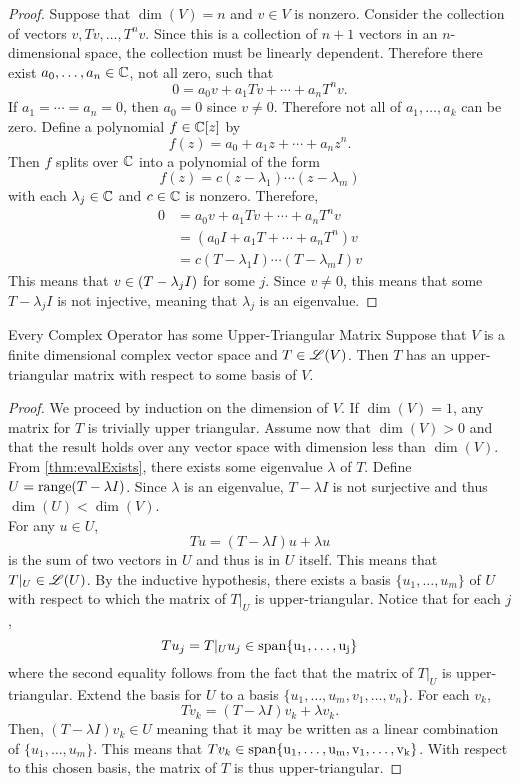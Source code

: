 \documentclass[../AlgebraQualSolutions.tex]{subfiles}
\begin{document}
\begin{proof}
    Suppose that $\dim(V) = n$ and $v \in V$ is nonzero. Consider the collection of vectors $v, Tv, \ldots, T^nv$. Since this is a collection of $n + 1$ vectors in an $n$-dimensional space, the collection must be linearly dependent. Therefore there exist $a_0,\ldots, a_n \in \mathbb{C}$, not all zero, such that
        \[0 = a_0 v + a_1Tv + \cdots + a_n T^n v.\]
    If $a_1 = \cdots = a_n = 0$, then $a_0 = 0$ since $v \neq 0$. Therefore not all of $a_1,\ldots, a_k$ can be zero. Define a polynomial $f \in \mathbb{C}[z]$ by
        \[f(z) = a_0 + a_1z + \cdots + a_nz^n. \]
    Then $f$ splits over $\mathbb{C}$ into a polynomial of the form
        \[f(z) = c(z- \lambda_1)\cdots (z - \lambda_m) \]
    with each $\lambda_j \in \mathbb{C}$ and $c \in \mathbb{C}$ is nonzero. Therefore,
        \begin{align*}
            0 &= a_0 v + a_1Tv + \cdots + a_n T^n v\\
            &= (a_0I + a_1T + \cdots + a_nT^n)v\\
            &= c(T- \lambda_1I)\cdots (T - \lambda_mI)v
        \end{align*}
    This means that $v \in \null(T - \lambda_j I)$ for some $j$. Since $v \neq 0$, this means that some $T - \lambda_j I$ is not injective, meaning that $\lambda_j$ is an eigenvalue.
\end{proof}

\gap

\begin{prop}{Every Complex Operator has some Upper-Triangular Matrix}{}
    Suppose that $V$ is a finite dimensional complex vector space and $T \in \mathscr{L}(V)$. Then $T$ has an upper-triangular matrix with respect to some basis of $V$.
\end{prop}

\begin{proof}
    We proceed by induction on the dimension of $V$. If $\dim(V) = 1$, any matrix for $T$ is trivially upper triangular. Assume now that $\dim(V) > 0$ and that the result holds over any vector space with dimension less than $\dim(V)$. From \ref{thm:evalExists}, there exists some eigenvalue $\lambda$ of $T$. Define $U = \mathrm{range}(T - \lambda I)$. Since $\lambda$ is an eigenvalue, $T - \lambda I$ is not surjective and thus $\dim(U) < \dim(V)$.\\

    For any $u \in U$,
        \[Tu = (T - \lambda I)u + \lambda u\]
    is the sum of two vectors in $U$ and thus is in $U$ itself. This means that $T|_U \in \mathscr{L}(U)$. By the inductive hypothesis, there exists a basis $\{u_1,\ldots,u_m\}$ of $U$ with respect to which the matrix of $T|_U$ is upper-triangular. Notice that for each $j$,
        \[Tu_j = T|_Uu_j \in \rm{span}\{u_1,\ldots,u_j\}\]
    where the second equality follows from the fact that the matrix of $T|_U$ is upper-triangular. Extend the basis for $U$ to a basis $\{u_1,\ldots,u_m,v_1,\ldots,v_n\}$. For each $v_k$,
        \[Tv_k = (T -\lambda I)v_k + \lambda v_k.\]
    Then, $(T -\lambda I)v_k \in U$ meaning that it may be written as a linear combination of $\{u_1,\ldots, u_m\}$. This means that $Tv_k \in \rm{span}\{u_1,\ldots,u_m,v_1,\ldots, v_k\}$. With respect to this chosen basis, the  matrix of $T$ is thus upper-triangular.
\end{proof}
\end{document}
